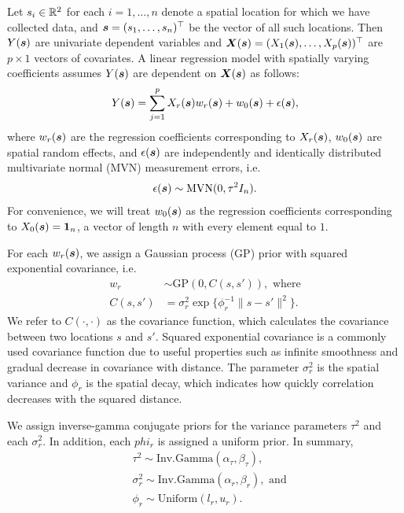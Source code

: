 Let $s_i \in \mathbb{R}^2$ for each $i = 1, \dots, n$ denote a spatial location for which we have collected data, and $\boldsymbol{s} = (s_1, \dots, s_n)^\top$ be the vector of all such locations. Then $Y(\boldsymbol{s})$ are univariate dependent variables and $\boldsymbol{X}(\boldsymbol{s}) = (X_1(\boldsymbol{s}), \dots, X_p(\boldsymbol{s}))^\top$ are $p \times 1$ vectors of covariates. A linear regression model with spatially varying coefficients assumes $Y(\boldsymbol{s})$ are dependent on $\boldsymbol{X}(\boldsymbol{s})$ as follows:
\begin{align*}
    Y(\boldsymbol{s}) = \sum_{j=1}^p X_r(\boldsymbol{s})w_r(\boldsymbol{s}) + w_0(\boldsymbol{s}) + \epsilon(\boldsymbol{s}),
\end{align*}
where $w_r(\boldsymbol{s})$ are the regression coefficients corresponding to $X_r(\boldsymbol{s})$, $w_0(\boldsymbol{s})$ are spatial random effects, and $\epsilon(\boldsymbol{s})$ are independently and identically distributed multivariate normal (MVN) measurement errors, i.e.
\begin{align*}
    \epsilon(\boldsymbol{s}) \sim \text{MVN}(0, \tau^2 I_n).
\end{align*}
For convenience, we will treat $w_0(\boldsymbol{s})$ as the regression coefficients corresponding to $X_0(\boldsymbol{s}) = \mathbf{1}_n$, a vector of length $n$ with every element equal to $1$.

For each $w_r(\boldsymbol{s})$, we assign a Gaussian process (GP) prior with squared exponential covariance, i.e.
\begin{align*}
    w_r &\sim \text{GP}(0, C(s, s')), \text{ where}\\
    C(s, s') &= \sigma_r^2\exp\{\phi_r^{-1}\|s-s'\|^2\}.
\end{align*}
We refer to $C(\cdot, \cdot)$ as the covariance function, which calculates the covariance between two locations $s$ and $s'$. Squared exponential covariance is a commonly used covariance function due to useful properties such as infinite smoothness and gradual decrease in covariance with distance. The parameter $\sigma_r^2$ is the spatial variance and $\phi_r$ is the spatial decay, which indicates how quickly correlation decreases with the squared distance.

We assign inverse-gamma conjugate priors for the variance parameters $\tau^2$ and each $\sigma_r^2$. In addition, each $phi_r$ is assigned a uniform prior. In summary,
\begin{align*}
    & \tau^2 \sim \text{Inv.Gamma}(\alpha_\tau, \beta_\tau),\\
    & \sigma_r^2 \sim \text{Inv.Gamma}(\alpha_r, \beta_r), \text{ and}\\
    & \phi_r \sim \text{Uniform}(l_r, u_r).
\end{align*}

